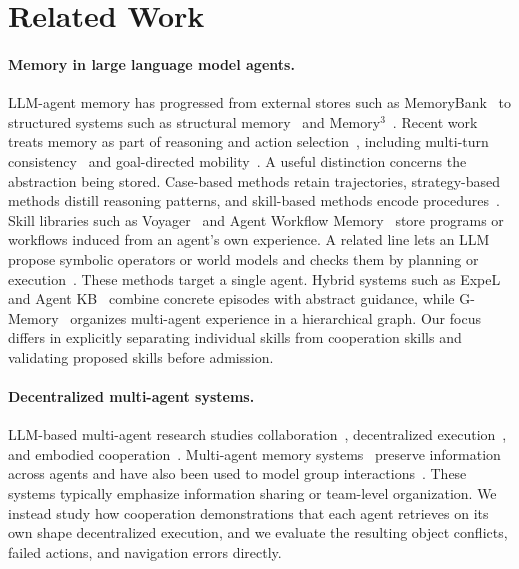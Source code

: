 \documentclass{article}
\theoremstyle{plain}
\theoremstyle{definition}
\theoremstyle{remark}
\begin{document}
 
 
\section{Related Work}
 
\paragraph{Memory in large language model agents.}
LLM-agent memory has progressed from external stores such as MemoryBank~\citep{Zhong2023MemoryBankELA} to structured systems such as structural memory~\citep{zeng2024structural} and Memory$^3$~\citep{Yang2024Memory3LMA}. Recent work treats memory as part of reasoning and action selection~\citep{xu2025mem,zhang2024agentic}, including multi-turn consistency~\citep{hu2025evaluating} and goal-directed mobility~\citep{feng2024agentmove}. A useful distinction concerns the abstraction being stored. Case-based methods retain trajectories, strategy-based methods distill reasoning patterns, and skill-based methods encode procedures~\citep{zhang2024survey}. Skill libraries such as Voyager~\citep{wang2023voyager} and Agent Workflow Memory~\citep{wang2024agent} store programs or workflows induced from an agent's own experience. A related line lets an LLM propose symbolic operators or world models and checks them by planning or execution~\citep{wong2024learning,guan2023leveraging}. These methods target a single agent. Hybrid systems such as ExpeL~\citep{zhao2024expel} and Agent KB~\citep{tang2025agent} combine concrete episodes with abstract guidance, while G-Memory~\citep{zhang2025g} organizes multi-agent experience in a hierarchical graph. Our focus differs in explicitly separating individual skills from cooperation skills and validating proposed skills before admission.
 
 
\paragraph{Decentralized multi-agent systems.}
LLM-based multi-agent research studies collaboration~\citep{guo2024large,tran2025multi}, decentralized execution~\citep{chen2024scalable,yang2025agentnet}, and embodied cooperation~\citep{zhang2023building}. Multi-agent memory systems~\citep{wang2025mirix,zhang2025g} preserve information across agents and have also been used to model group interactions~\citep{haase2025beyond}. These systems typically emphasize information sharing or team-level organization. We instead study how cooperation demonstrations that each agent retrieves on its own shape decentralized execution, and we evaluate the resulting object conflicts, failed actions, and navigation errors directly.
\end{document}
